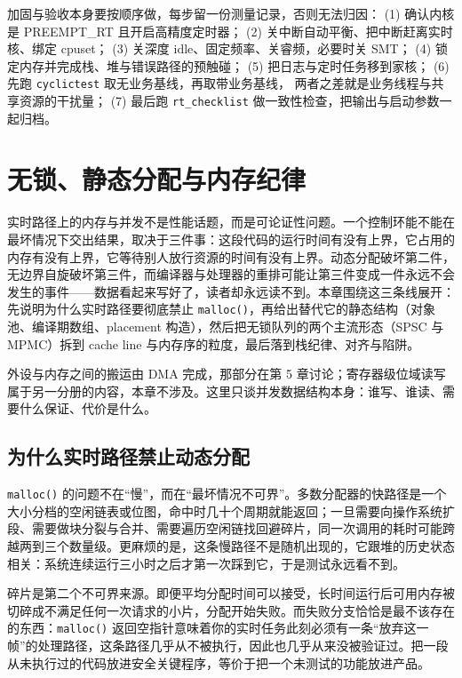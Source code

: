 \documentclass[12pt,a4paper,fontset=fandol]{ctexbook}
\newcommand{\Fn}[1]{\texttt{#1()}}
\newcommand{\Tp}[1]{\texttt{#1}}
\begin{document}
加固与验收本身要按顺序做，每步留一份测量记录，否则无法归因：
(1) 确认内核是 PREEMPT\_RT 且开启高精度定时器；
(2) 关中断自动平衡、把中断赶离实时核、绑定 cpuset；
(3) 关深度 idle、固定频率、关睿频，必要时关 SMT；
(4) 锁定内存并完成栈、堆与错误路径的预触碰；
(5) 把日志与定时任务移到家核；
(6) 先跑 \Tp{cyclictest} 取无业务基线，再取带业务基线，
两者之差就是业务线程与共享资源的干扰量；
(7) 最后跑 \Tp{rt\_checklist} 做一致性检查，把输出与启动参数一起归档。

\chapter{无锁、静态分配与内存纪律}
\label{ch:ch09-lockless-memory}

实时路径上的内存与并发不是性能话题，而是可论证性问题。一个控制环能不能在最坏情况下交出结果，取决于三件事：这段代码的运行时间有没有上界，它占用的内存有没有上界，它等待别人放行资源的时间有没有上界。动态分配破坏第二件，无边界自旋破坏第三件，而编译器与处理器的重排可能让第三件变成一件永远不会发生的事件——数据看起来写好了，读者却永远读不到。本章围绕这三条线展开：先说明为什么实时路径要彻底禁止 \Fn{malloc}，再给出替代它的静态结构（对象池、编译期数组、placement 构造），然后把无锁队列的两个主流形态（SPSC 与 MPMC）拆到 cache line 与内存序的粒度，最后落到栈纪律、对齐与陷阱。

外设与内存之间的搬运由 DMA 完成，那部分在第 5 章讨论；寄存器级位域读写属于另一分册的内容，本章不涉及。这里只谈并发数据结构本身：谁写、谁读、需要什么保证、代价是什么。

\section{为什么实时路径禁止动态分配}

\Fn{malloc} 的问题不在“慢”，而在“最坏情况不可界”。多数分配器的快路径是一个大小分档的空闲链表或位图，命中时几十个周期就能返回；一旦需要向操作系统扩段、需要做块分裂与合并、需要遍历空闲链找回避碎片，同一次调用的耗时可能跨越两到三个数量级。更麻烦的是，这条慢路径不是随机出现的，它跟堆的历史状态相关：系统连续运行三小时之后才第一次踩到它，于是测试永远看不到。

碎片是第二个不可界来源。即便平均分配时间可以接受，长时间运行后可用内存被切碎成不满足任何一次请求的小片，分配开始失败。而失败分支恰恰是最不该存在的东西：\Fn{malloc} 返回空指针意味着你的实时任务此刻必须有一条“放弃这一帧”的处理路径，这条路径几乎从不被执行，因此也几乎从来没被验证过。把一段从未执行过的代码放进安全关键程序，等价于把一个未测试的功能放进产品。
\end{document}
